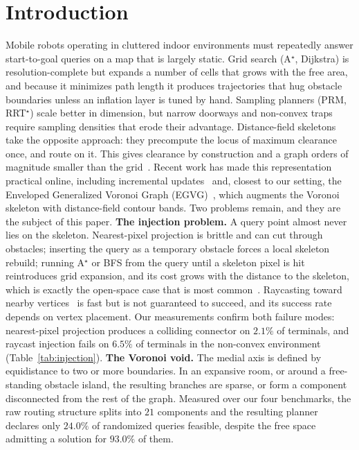 \documentclass[conference]{IEEEtran}
\begin{document}
\section{Introduction}
Mobile robots operating in cluttered indoor environments must repeatedly answer start-to-goal queries on a map that is largely static. Grid search (A$^\star$, Dijkstra) is resolution-complete but expands a number of cells that grows with the free area, and because it minimizes path length it produces trajectories that hug obstacle boundaries unless an inflation layer is tuned by hand. Sampling planners (PRM, RRT$^\star$) scale better in dimension, but narrow doorways and non-convex traps require sampling densities that erode their advantage.
Distance-field skeletons take the opposite approach: they precompute the locus of maximum clearance once, and route on it. This gives clearance by construction and a graph orders of magnitude smaller than the grid~\cite{lau2013,oleynikova2018,qi2022pruned}. Recent work has made this representation practical online, including incremental updates~\cite{lau2013} and, closest to our setting, the Enveloped Generalized Voronoi Graph (EGVG)~\cite{qi2025egvg}, which augments the Voronoi skeleton with distance-field contour bands.
Two problems remain, and they are the subject of this paper.
\textbf{The injection problem.} A query point almost never lies on the skeleton. Nearest-pixel projection is brittle and can cut through obstacles; inserting the query as a temporary obstacle forces a local skeleton rebuild; running A$^\star$ or BFS from the query until a skeleton pixel is hit reintroduces grid expansion, and its cost grows with the distance to the skeleton, which is exactly the open-space case that is most common~\cite{qi2025egvg,oleynikova2018}. Raycasting toward nearby vertices~\cite{qi2025egvg} is fast but is not guaranteed to succeed, and its success rate depends on vertex placement. Our measurements confirm both failure modes: nearest-pixel projection produces a colliding connector on $2.1\%$ of terminals, and raycast injection fails on $6.5\%$ of terminals in the non-convex environment (Table~\ref{tab:injection}).
\textbf{The Voronoi void.} The medial axis is defined by equidistance to two or more boundaries. In an expansive room, or around a free-standing obstacle island, the resulting branches are sparse, or form a component disconnected from the rest of the graph. Measured over our four benchmarks, the raw routing structure splits into $21$ components and the resulting planner declares only $24.0\%$ of randomized queries feasible, despite the free space admitting a solution for $93.0\%$ of them.
\end{document}

